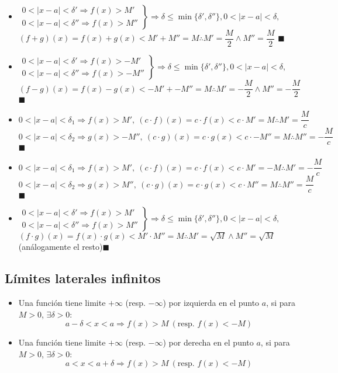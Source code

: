 \documentclass[11pt,a4paper]{article}
\newcommand*{\QEDA}{\null\nobreak\hfill\ensuremath{\blacksquare}}
\begin{document}
\begin{itemize}
\item $ \left.
\begin{array}{l}
0<|x-a|<\delta' \Rightarrow f(x)>M'\\
0<|x-a|<\delta'' \Rightarrow f(x)>M''
\end{array} \right\} \Rightarrow \delta \leq \min\{\delta', \delta''\}, 0<|x-a|<\delta,
$\\
$(f+g)(x) = f(x)+g(x) < M' + M'' = M \therefore M' = \dfrac{M}{2} \land M'' = \dfrac{M}{2}$ \QEDA

\item $ \left.
\begin{array}{l}
0<|x-a|<\delta' \Rightarrow f(x)>-M'\\
0<|x-a|<\delta'' \Rightarrow f(x)>-M''
\end{array} \right\} \Rightarrow \delta \leq \min\{\delta', \delta''\}, 0<|x-a|<\delta,
$\\
$(f-g)(x) = f(x)-g(x) < -M' + -M'' = M \therefore M' = -\dfrac{M}{2} \land M'' = -\dfrac{M}{2}$ \QEDA

\item $0<|x-a|<\delta_1 \Rightarrow f(x) > M',\ (c\cdot f)(x)=c\cdot f(x) < c\cdot M' = M \therefore M'=\dfrac{M}{c}$\\
\indent $0<|x-a|<\delta_2 \Rightarrow g(x) > -M'',\ (c\cdot g)(x)=c\cdot g(x) < c\cdot -M'' = M \therefore M''= - \dfrac{M}{c}$ \QEDA

\item $0<|x-a|<\delta_1 \Rightarrow f(x) > M',\ (c\cdot f)(x)=c\cdot f(x) < c\cdot M' = -M \therefore M'=-\dfrac{M}{c}$\\
\indent $0<|x-a|<\delta_2 \Rightarrow g(x) > M'',\ (c\cdot g)(x)=c\cdot g(x) < c\cdot M'' = M \therefore M''=\dfrac{M}{c}$ \QEDA

\item $ \left.
\begin{array}{l}
0<|x-a|<\delta' \Rightarrow f(x)>M'\\
0<|x-a|<\delta'' \Rightarrow f(x)>M''
\end{array} \right\} \Rightarrow \delta \leq \min\{\delta', \delta''\}, 0<|x-a|<\delta,
$\\
$(f\cdot g)(x) = f(x)\cdot g(x) < M' \cdot M'' = M \therefore M' = \sqrt{M} \land M'' = \sqrt{M}$ (an\'alogamente el resto)\QEDA
\end{itemize}
\subsection{L\'imites laterales infinitos}
\begin{itemize}
\item Una funci\'on tiene limite $+\infty$ (resp. $-\infty$) por izquierda en el punto $a$, si para $M>0$, $\exists \delta>0$: $$a-\delta<x<a \Rightarrow f(x) > M\ (\text{resp. } f(x)<-M)$$
\item Una funci\'on tiene limite $+\infty$ (resp. $-\infty$) por derecha en el punto $a$, si para $M>0$, $\exists \delta>0$: $$a<x<a+\delta \Rightarrow f(x) > M\ (\text{resp. } f(x)<-M)$$
\end{itemize}
\end{document}
